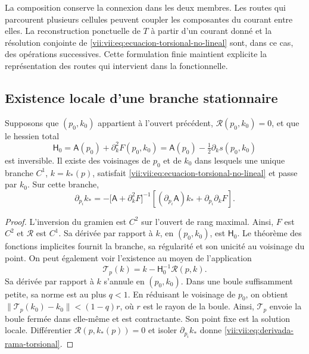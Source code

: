 La composition conserve la connexion dans les deux membres. Les routes
qui parcourent plusieurs cellules peuvent coupler les composantes du
courant entre elles. La reconstruction ponctuelle de \(T\) à partir
d'un courant donné et la résolution conjointe de
\eqref{vii:vii:eq:ecuacion-torsional-no-lineal} sont, dans ce cas,
des opérations successives. Cette formulation finie maintient explicite
la représentation des routes qui intervient dans la fonctionnelle.

\subsection{Existence locale d'une branche stationnaire}
\label{vii:vii:subsec:rama-torsional-local}

\begin{theorem}
\label{vii:vii:thm:rama-torsional-local}
Supposons que \((p_0,k_0)\) appartient à l'ouvert précédent,
\(\mathcal R(p_0,k_0)=0\), et que le hessien total
\begin{equation}
 \mathsf H_0
 =\mathsf A(p_0)+\partial_k^2F(p_0,k_0)
 =\mathsf A(p_0)-\tfrac12\partial_ks(p_0,k_0)
 \label{vii:vii:eq:hessiano-total-torsional}
\end{equation}
est inversible. Il existe des voisinages de \(p_0\) et de \(k_0\) dans lesquels
une unique branche \(C^1\), \(k=k_*(p)\), satisfait
\eqref{vii:vii:eq:ecuacion-torsional-no-lineal} et passe par \(k_0\).
Sur cette branche,
\begin{equation}
 \partial_{p_i}k_*
 =-\bigl[\mathsf A+\partial_k^2F\bigr]^{-1}
     \left[(\partial_{p_i}\mathsf A)k_*
                      +\partial_{p_i}\partial_kF\right].
 \label{vii:vii:eq:derivada-rama-torsional}
\end{equation}
\end{theorem}

\begin{proof}
L'inversion du gramien est \(C^2\) sur l'ouvert de rang maximal. Ainsi, \(F\) est \(C^2\) et \(\mathcal R\) est \(C^1\). Sa dérivée par rapport à \(k\), en \((p_0,k_0)\), est \(\mathsf H_0\). Le théorème des fonctions implicites fournit la branche, sa régularité et son unicité au voisinage du point. On peut également voir l'existence au moyen de l'application
\[
 \mathcal T_p(k)=k-\mathsf H_0^{-1}\mathcal R(p,k).
\]
Sa dérivée par rapport à \(k\) s'annule en \((p_0,k_0)\).
Dans une boule suffisamment petite, sa norme est au plus
\(q<1\). En réduisant le voisinage de \(p_0\), on obtient
\(\|\mathcal T_p(k_0)-k_0\|<(1-q)r\), où \(r\) est le
rayon de la boule. Ainsi, \(\mathcal T_p\) envoie la boule fermée
dans elle-même et est contractante. Son point fixe est la solution locale.
Différentier \(\mathcal R(p,k_*(p))=0\) et isoler
\(\partial_{p_i}k_*\) donne
\eqref{vii:vii:eq:derivada-rama-torsional}.
\end{proof}

